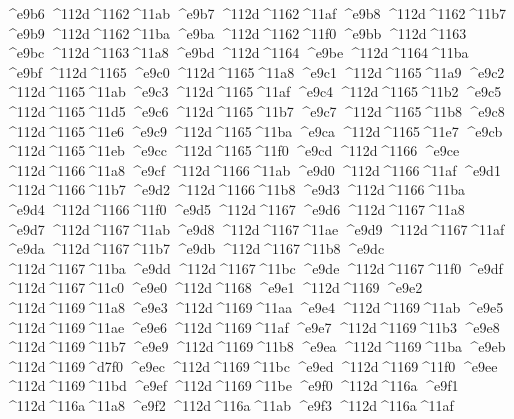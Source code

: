 \checkit ^^^^e9b6 ^^^^112d^^^^1162^^^^11ab
\checkit ^^^^e9b7 ^^^^112d^^^^1162^^^^11af
\checkit ^^^^e9b8 ^^^^112d^^^^1162^^^^11b7
\checkit ^^^^e9b9 ^^^^112d^^^^1162^^^^11ba
\checkit ^^^^e9ba ^^^^112d^^^^1162^^^^11f0
\checkit ^^^^e9bb ^^^^112d^^^^1163
\checkit ^^^^e9bc ^^^^112d^^^^1163^^^^11a8
\checkit ^^^^e9bd ^^^^112d^^^^1164
\checkit ^^^^e9be ^^^^112d^^^^1164^^^^11ba
\checkit ^^^^e9bf ^^^^112d^^^^1165
\checkit ^^^^e9c0 ^^^^112d^^^^1165^^^^11a8
\checkit ^^^^e9c1 ^^^^112d^^^^1165^^^^11a9
\checkit ^^^^e9c2 ^^^^112d^^^^1165^^^^11ab
\checkit ^^^^e9c3 ^^^^112d^^^^1165^^^^11af
\checkit ^^^^e9c4 ^^^^112d^^^^1165^^^^11b2
\checkit ^^^^e9c5 ^^^^112d^^^^1165^^^^11d5
\checkit ^^^^e9c6 ^^^^112d^^^^1165^^^^11b7
\checkit ^^^^e9c7 ^^^^112d^^^^1165^^^^11b8
\checkit ^^^^e9c8 ^^^^112d^^^^1165^^^^11e6
\checkit ^^^^e9c9 ^^^^112d^^^^1165^^^^11ba
\checkit ^^^^e9ca ^^^^112d^^^^1165^^^^11e7
\checkit ^^^^e9cb ^^^^112d^^^^1165^^^^11eb
\checkit ^^^^e9cc ^^^^112d^^^^1165^^^^11f0
\checkit ^^^^e9cd ^^^^112d^^^^1166
\checkit ^^^^e9ce ^^^^112d^^^^1166^^^^11a8
\checkit ^^^^e9cf ^^^^112d^^^^1166^^^^11ab
\checkit ^^^^e9d0 ^^^^112d^^^^1166^^^^11af
\checkit ^^^^e9d1 ^^^^112d^^^^1166^^^^11b7
\checkit ^^^^e9d2 ^^^^112d^^^^1166^^^^11b8
\checkit ^^^^e9d3 ^^^^112d^^^^1166^^^^11ba
\checkit ^^^^e9d4 ^^^^112d^^^^1166^^^^11f0
\checkit ^^^^e9d5 ^^^^112d^^^^1167
\checkit ^^^^e9d6 ^^^^112d^^^^1167^^^^11a8
\checkit ^^^^e9d7 ^^^^112d^^^^1167^^^^11ab
\checkit ^^^^e9d8 ^^^^112d^^^^1167^^^^11ae
\checkit ^^^^e9d9 ^^^^112d^^^^1167^^^^11af
\checkit ^^^^e9da ^^^^112d^^^^1167^^^^11b7
\checkit ^^^^e9db ^^^^112d^^^^1167^^^^11b8
\checkit ^^^^e9dc ^^^^112d^^^^1167^^^^11ba
\checkit ^^^^e9dd ^^^^112d^^^^1167^^^^11bc
\checkit ^^^^e9de ^^^^112d^^^^1167^^^^11f0
\checkit ^^^^e9df ^^^^112d^^^^1167^^^^11c0
\checkit ^^^^e9e0 ^^^^112d^^^^1168
\checkit ^^^^e9e1 ^^^^112d^^^^1169
\checkit ^^^^e9e2 ^^^^112d^^^^1169^^^^11a8
\checkit ^^^^e9e3 ^^^^112d^^^^1169^^^^11aa
\checkit ^^^^e9e4 ^^^^112d^^^^1169^^^^11ab
\checkit ^^^^e9e5 ^^^^112d^^^^1169^^^^11ae
\checkit ^^^^e9e6 ^^^^112d^^^^1169^^^^11af
\checkit ^^^^e9e7 ^^^^112d^^^^1169^^^^11b3
\checkit ^^^^e9e8 ^^^^112d^^^^1169^^^^11b7
\checkit ^^^^e9e9 ^^^^112d^^^^1169^^^^11b8
\checkit ^^^^e9ea ^^^^112d^^^^1169^^^^11ba
\checkit ^^^^e9eb ^^^^112d^^^^1169^^^^d7f0
\checkit ^^^^e9ec ^^^^112d^^^^1169^^^^11bc
\checkit ^^^^e9ed ^^^^112d^^^^1169^^^^11f0
\checkit ^^^^e9ee ^^^^112d^^^^1169^^^^11bd
\checkit ^^^^e9ef ^^^^112d^^^^1169^^^^11be
\checkit ^^^^e9f0 ^^^^112d^^^^116a
\checkit ^^^^e9f1 ^^^^112d^^^^116a^^^^11a8
\checkit ^^^^e9f2 ^^^^112d^^^^116a^^^^11ab
\checkit ^^^^e9f3 ^^^^112d^^^^116a^^^^11af
